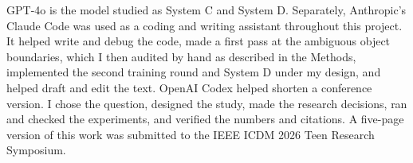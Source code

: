 \documentclass[12pt,letterpaper]{article}
\begin{document}
GPT-4o is the model studied as System C and System D. Separately,
Anthropic's Claude Code was used as a coding and writing assistant
throughout this project. It helped write and debug the code, made a first
pass at the ambiguous object boundaries, which I then audited by hand as
described in the Methods, implemented the second training round and System
D under my design, and helped draft and edit the text. OpenAI Codex helped
shorten a conference version. I chose the question, designed the study,
made the research decisions, ran and checked the experiments, and verified
the numbers and citations. A five-page version of this work was submitted
to the IEEE ICDM 2026 Teen Research Symposium.
\end{document}
